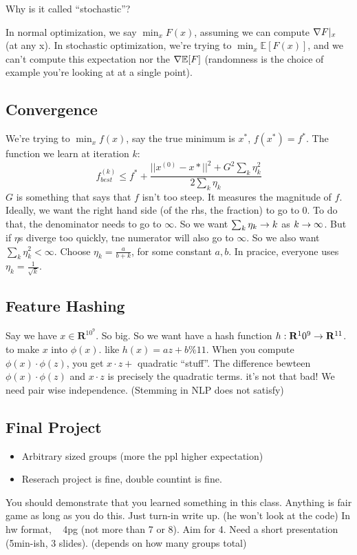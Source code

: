 Why is it called ``stochastic''?

In normal optimization, we say $\min_x F(x)$, assuming we can compute
$\nabla F|_x$ (at any x).
In stochastic optimization, we're trying to $\min_x \mathbb{E}[F(x)]$,
and we can't compute this expectation nor the $\nabla \mathbb{E}[F]$
(randomness is the choice of example you're looking at at a single
point). 

\subsection{Convergence}
We're trying to $\min_x f(x)$, say the true minimum is $x^*$, $f(x^*)
= f^*$. The function we learn at iteration $k$:
$$f^{(k)}_{best} \le f^{*} + \frac{|| x^{(0)}-x*  ||^2 + G^2
  \sum_k\eta_k^2}{2\sum_k \eta_k}$$
$G$ is something that says that $f$ isn't too steep. It measures the
magnitude of $f$.
Ideally, we want the right hand side (of the rhs, the fraction) to go
to 0. To do that, the denominator needs to go to $\infty$. So we want
$\sum_k \eta_k \rightarrow k$ as $k\rightarrow \infty$. But if $\eta$s diverge too
quickly, tne numerator will also go to $\infty$. So we also want
$\sum_k \eta_k^2 < \infty$. Choose $\eta_k = \frac{a}{b+k}$, for some
constant $a,b$. In pracice, everyone uses $\eta_k =
\frac{1}{\sqrt{k}}$.

\subsection{Feature Hashing}
\label{sec:featurehashing}
Say we have $x\in \mathbf{R}^{10^9}$. So big. So we want have a hash
 function $h: \mathbf{R}^10^9 \rightarrow \mathbf{R}^{11}$. to make $x$ into $\phi(x)$.
 like $h(x) = az+b\%11$.
When you compute $\phi(x)\cdot \phi(z)$, you get $x\cdot z +$
quadratic ``stuff''. The difference bewteen $\phi(x)\cdot \phi(z)$ and
$x\cdot z$ is precisely the quadratic terms. it's not that bad! We
need pair wise independence. (Stemming in NLP does not satisfy)

\subsection{Final Project}
\label{sec:finalproject}
\begin{itemize}
\item Arbitrary sized groups (more the ppl higher expectation)
\item Reserach project is fine, double countint is fine.
\end{itemize}
You should demonstrate that you learned something in this
class. Anything is fair game as long as you do this. Just turn-in
write up. (he won't look at the code) In hw format, ~ 4pg (not more
than 7 or 8). Aim for 4.
Need a short presentation (5min-ish, 3 slides). (depends on how many groups total)

